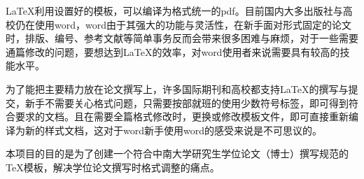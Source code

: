 \begin{abstractcn}
LaTeX利用设置好的模板，可以编译为格式统一的pdf。目前国内大多出版社与高校仍在使用word，word由于其强大的功能与灵活性，在新手面对形式固定的论文时，排版、编号、参考文献等简单事务反而会带来很多困难与麻烦，对于一些需要通篇修改的问题，要想达到LaTeX的效率，对word使用者来说需要具有较高的技能水平。

为了能把主要精力放在论文撰写上，许多国际期刊和高校都支持LaTeX的撰写与提交，新手不需要关心格式问题，只需要按部就班的使用少数符号标签，即可得到符合要求的文档。且在需要全篇格式修改时，更换或修改模板文件，即可直接重新编译为新的样式文档，这对于word新手使用word的感受来说是不可思议的。

本项目的目的是为了创建一个符合中南大学研究生学位论文（博士）撰写规范的TeX模板，解决学位论文撰写时格式调整的痛点。


\end{abstractcn}